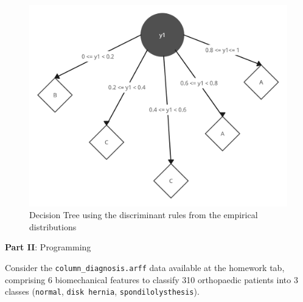\documentclass[12pt]{article}
\begin{document}
\begin{enumerate}[leftmargin=\labelsep]
        \begin{figure}[H]
          \centering
          \includegraphics[width=12cm]{./assets/decision_tree_ex5_PartI.png}
          \caption{Decision Tree using the discriminant rules from the empirical distributions}
          \label{fig:decision-tree-root-split}
        \end{figure}

\end{enumerate}

\vskip 0.5cm

\begin{center}
  \large{\textbf{Part II}: Programming}\normalsize
\end{center}

\noindent Consider the \texttt{column\_diagnosis.arff} data available at the homework tab, comprising 6 biomechanical
features to classify 310 orthopaedic patients into 3 classes (\texttt{normal}, \texttt{disk hernia}, \texttt{spondilolysthesis}).
\end{document}
